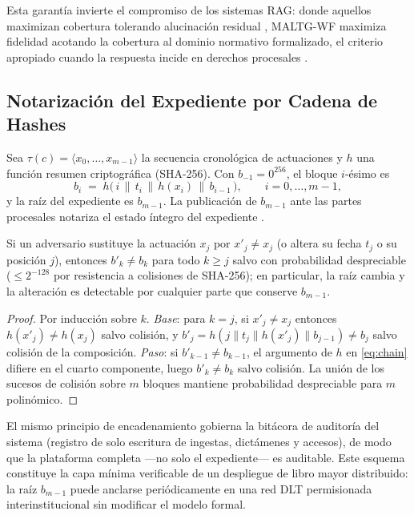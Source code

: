 \documentclass[computers,article,submit,pdftex,moreauthors]{Definitions/mdpi}
\begin{document}
Esta garantía invierte el compromiso de los sistemas RAG: donde aquellos maximizan cobertura tolerando alucinación residual \cite{Magesh2025}, MALTG-WF maximiza fidelidad acotando la cobertura al dominio normativo formalizado, el criterio apropiado cuando la respuesta incide en derechos procesales \cite{Rudin2019}.

\subsection{Notarización del Expediente por Cadena de Hashes}

\begin{Definition}
Sea $\tau(c) = \langle x_0, \dots, x_{m-1} \rangle$ la secuencia cronológica de actuaciones y $h$ una función resumen criptográfica (SHA-256). Con $b_{-1} = 0^{256}$, el bloque $i$-ésimo es
\begin{equation}
b_i \;=\; h\bigl(\, i \,\|\, t_i \,\|\, h(x_i) \,\|\, b_{i-1} \,\bigr), \qquad i = 0, \dots, m-1,
\label{eq:chain}
\end{equation}
y la raíz del expediente es $b_{m-1}$. La publicación de $b_{m-1}$ ante las partes procesales notariza el estado íntegro del expediente \cite{Haber1991}.
\end{Definition}

\begin{Proposition}
Si un adversario sustituye la actuación $x_j$ por $x'_j \neq x_j$ (o altera su fecha $t_j$ o su posición $j$), entonces $b'_k \neq b_k$ para todo $k \geq j$ salvo con probabilidad despreciable ($\le 2^{-128}$ por resistencia a colisiones de SHA-256); en particular, la raíz cambia y la alteración es detectable por cualquier parte que conserve $b_{m-1}$.
\end{Proposition}

\begin{proof}
Por inducción sobre $k$. \emph{Base}: para $k = j$, si $x'_j \neq x_j$ entonces $h(x'_j) \neq h(x_j)$ salvo colisión, y $b'_j = h(j \| t_j \| h(x'_j) \| b_{j-1}) \neq b_j$ salvo colisión de la composición. \emph{Paso}: si $b'_{k-1} \neq b_{k-1}$, el argumento de $h$ en \eqref{eq:chain} difiere en el cuarto componente, luego $b'_k \neq b_k$ salvo colisión. La unión de los sucesos de colisión sobre $m$ bloques mantiene probabilidad despreciable para $m$ polinómico.
\end{proof}

El mismo principio de encadenamiento gobierna la bitácora de auditoría del sistema (registro de solo escritura de ingestas, dictámenes y accesos), de modo que la plataforma completa ---no solo el expediente--- es auditable. Este esquema constituye la capa mínima verificable de un despliegue de libro mayor distribuido: la raíz $b_{m-1}$ puede anclarse periódicamente en una red DLT permisionada interinstitucional \cite{Olnes2017,Christidis2016} sin modificar el modelo formal.
\end{document}
